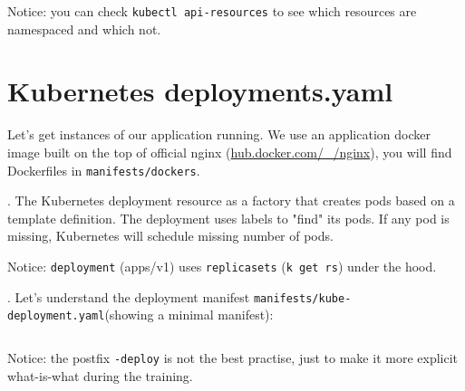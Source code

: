 \documentclass[12pt, letterpaper]{article}
\begin{document}
Notice: you can check \verb|kubectl api-resources| to see which resources are namespaced and which not.

%
%
\pagebreak
\section{Kubernetes deployments.yaml}

Let's get instances of our application running. We use an application docker image built on the top of official nginx (\href{https://hub.docker.com/\_/nginx}{hub.docker.com/\_/nginx}), you will find Dockerfiles in \texttt{manifests/dockers}.

. The Kubernetes deployment resource as a factory that creates pods based on a template definition. The deployment uses labels to "find" its pods. If any pod is missing, Kubernetes will schedule missing number of pods.

\begin{figure}[ht]
\centering
{}
\end{figure}

Notice: \verb|deployment| (apps/v1) uses \verb|replicasets| (\verb|k get rs|) under the hood.

. Let's understand the deployment manifest \texttt{manifests/kube-deployment.yaml}(showing a minimal manifest):

\inputminted{yaml}{manifests/kube-deployment.yaml}

\smallskip
Notice: the postfix \verb|-deploy| is not the best practise, just to make it more explicit what-is-what during the training.
\end{document}
